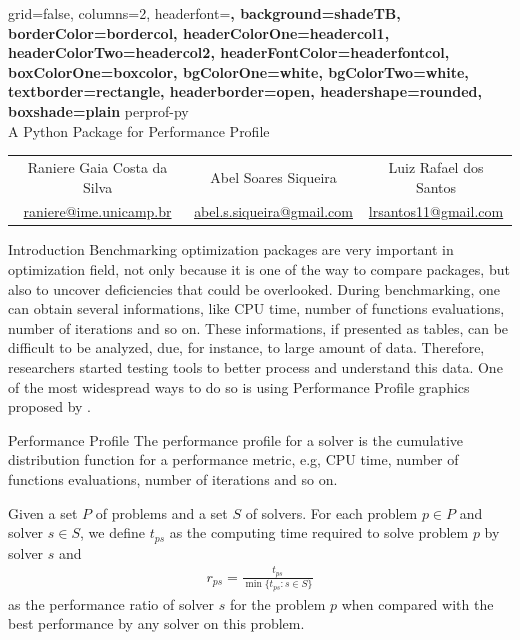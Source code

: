 \documentclass[a0paper,portrait]{baposter}
\begin{document}
\begin{poster}
  {
    grid=false,
    columns=2,
    headerfont=\Large\sf\bf,
    background=shadeTB,
    borderColor=bordercol,
    headerColorOne=headercol1,
    headerColorTwo=headercol2,
    headerFontColor=headerfontcol,
    boxColorOne=boxcolor,
    bgColorOne=white,
    bgColorTwo=white,
    textborder=rectangle,
    headerborder=open,
    headershape=rounded,
    boxshade=plain
  }
  {
    \unicamplogol
  }
  {
    perprof-py \\ A Python Package for Performance Profile
  }
  {
    \begin{tabular}{ccc}
      Raniere Gaia Costa da Silva &
      Abel Soares Siqueira &
      Luiz Rafael dos Santos \\
      \url{raniere@ime.unicamp.br} &
      \url{abel.s.siqueira@gmail.com} &
      \url{lrsantos11@gmail.com}
    \end{tabular}
  }
  {
    \imecclogo
  }

  \begin{posterbox}[column=0]{Introduction}
    Benchmarking optimization packages are very important in optimization
    field, not only because it is one of the way to compare packages, but also
    to uncover deficiencies that could be overlooked. During benchmarking, one
    can obtain several informations, like CPU time, number of functions
    evaluations, number of iterations and so on. These informations, if
    presented as tables, can be difficult to be analyzed, due, for instance,
    to large amount of data. Therefore, researchers started testing tools to
    better process and understand this data.  One of the most widespread ways
    to do so is using Performance Profile graphics proposed by
    \citeauthor{Dolan2001}.
  \end{posterbox}

  \begin{posterbox}[column=0,below=auto]{Performance Profile}
    The performance profile for a solver is the cumulative distribution
    function for a performance metric, e.g, CPU time, number of functions
    evaluations, number of iterations and so on.

    Given a set $P$ of problems and a set $S$ of solvers. For each problem $p
    \in P$ and solver $s \in S$, we define $t_{ps}$ as the computing time
    required to solve problem $p$ by solver $s$ and
    \begin{align*}
      r_{ps} = \frac{t_{ps}}{\min\{t_{ps}: s \in S\}}
    \end{align*}
    as the performance ratio of solver $s$ for the problem $p$ when compared
    with the best performance by any solver on this problem.


\end{posterbox}
\end{poster}
\end{document}
